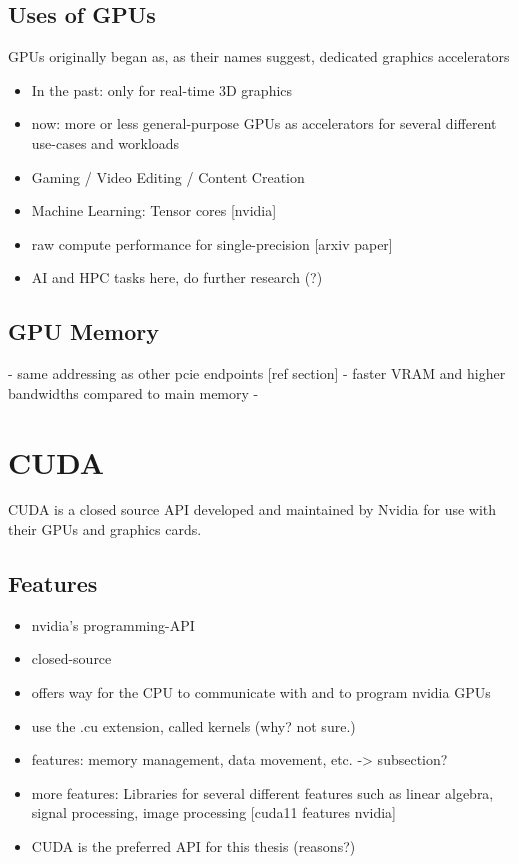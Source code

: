 \subsection{Uses of GPUs}

GPUs originally began as, as their names suggest, dedicated graphics accelerators

\begin{itemize}
\item In the past: only for real-time 3D graphics
\item now: more or less general-purpose GPUs as accelerators for several different use-cases and workloads
\item Gaming / Video Editing / Content Creation
\item Machine Learning: Tensor cores [nvidia]
\item raw compute performance for single-precision [arxiv paper]
\item AI and HPC tasks here, do further research (?)
\end{itemize}

\subsection{GPU Memory}

- same addressing as other pcie endpoints [ref section]
- faster VRAM and higher bandwidths compared to main memory
-

\section{CUDA}

CUDA is a closed source API developed and maintained by Nvidia for use with their GPUs and graphics cards. 

\subsection{Features}

\begin{itemize}
\item nvidia's programming-API
\item closed-source
\item offers way for the CPU to communicate with and to program nvidia GPUs
\item use the .cu extension, called kernels (why? not sure.)
\item features: memory management, data movement, etc. -> subsection?
\item more features: Libraries for several different features such as linear algebra, signal processing, image processing [cuda11 features nvidia]
\item CUDA is the preferred API for this thesis (reasons?)
\end{itemize}


